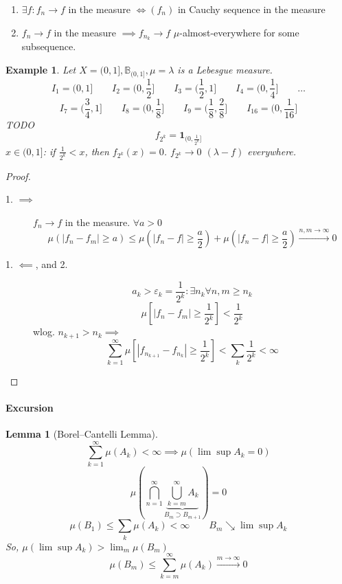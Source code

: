 \documentclass[a4paper]{article}
\newcounter{lecref}[section]
\numberwithin{lecref}{section}
\theoremstyle{break}
\newtheorem{example}[lecref]{Example}
\newtheorem{lemma}[lecref]{Lemma}
\newcommand{\Abs}[1]{\left|#1\right|}
\begin{document}
\begin{theorem}
  \begin{enumerate}
    \item $\exists f: f_n \to f$ in the measure $\iff (f_n)$ in Cauchy sequence in the measure
    \item $f_n \to f$ in the measure $\implies f_{n_k} \to f$ $\mu$-almost-everywhere for some subsequence.
  \end{enumerate}
\end{theorem}

\begin{example}
  Let $X = (0,1], \mathbb B_{(0, 1]}, \mu = \lambda$ is a Lebesgue measure.
  \[ I_1 = (0, 1] \qquad I_2 = (0, \frac12] \qquad I_3 = (\frac12, 1] \qquad I_4 = (0, \frac14] \qquad \dots \]
  \[ I_7 = (\frac34, 1] \qquad I_8 = (0, \frac18] \qquad I_9 = (\frac18, \frac28] \qquad I_{16} = (0, \frac1{16}] \]
  TODO
  \[ f_{2^k} = \mathbf 1_{(0, \frac{1}{2^k}]} \]
  $x \in (0, 1]$: if $\frac{1}{2^k} < x$, then $f_{2^k}(x) = 0$.
  $f_{2^k} \to 0$ $(\lambda-f)$ everywhere.
\end{example}

\begin{proof}
  \begin{description}
    \item[1. $\implies$]
      $f_n \to f$ in the measure. $\forall a > 0$
      \[ \mu\left(\Abs{f_n - f_m} \geq a\right) \leq \mu\left(\Abs{f_n - f} \geq \frac a2\right) + \mu\left(\Abs{f_n - f} \geq \frac a2\right) \xrightarrow{n,m \to \infty} 0 \]
    \item[1. $\impliedby$, and 2.]
      \[ a_k > \varepsilon_k = \frac1{2^k}: \exists n_k \forall n, m \geq n_k \]
      \[ \mu\left[\Abs{f_n - f_m} \geq \frac{1}{2^k}\right] < \frac{1}{2^k} \]
      wlog. $n_{k+1} > n_k \implies$
      \[ \sum_{k=1}^\infty \mu\left[\Abs{f_{n_{k+1}} - f_{n_k}} \geq \frac{1}{2^k}\right] < \sum_k \frac{1}{2^k} < \infty \]
  \end{description}
\end{proof}

\paragraph{Excursion}

\begin{lemma}[Borel--Cantelli Lemma]
  \[ \sum_{k=1}^\infty \mu(A_k) < \infty \implies \mu\left(\lim\sup{A_k} = 0\right) \]
  \[ \mu\left(\bigcap_{n=1}^{\infty} \underbrace{\bigcup_{k=m}^{\infty} A_k}_{B_m \supset B_{m+1}} \right) = 0 \]
  \[ \mu(B_1) \leq \sum_{k} \mu(A_k) < \infty \qquad B_m \searrow \lim\sup A_k \]
  So, $\mu(\lim\sup{A_k}) > \lim_m \mu(B_m)$
  \[ \mu(B_m) \leq \sum_{k=m}^{\infty} \mu(A_k) \xrightarrow{m \to \infty} 0 \]
\end{lemma}
\end{document}
